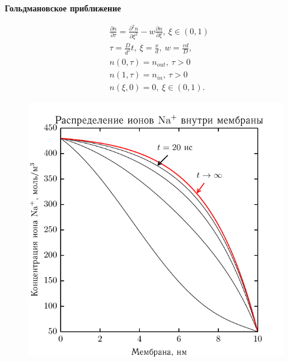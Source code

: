 \documentclass[10pt,pdf]{beamer}
\newcommand{\pder}[2] {\frac{\partial #1}{\partial #2}}
\newcommand{\ppder}[2]{\frac{\partial^2 #1}{\partial {#2}^2}}
\begin{document}
\begin{frame}
      \textbf{Гольдмановское приближение}

      \begin{minipage}{.47\textwidth}
\begingroup
\everymath{\scriptstyle}
\scriptsize
        \begin{align*}
            & \pder{n}{\tau} = \ppder{n}{\xi} -
                w\pder{n}{\xi},\ \xi\in(0,1) \\
            & \tau = \frac{D}{d^2}t,\ \xi = \frac{x}{d},\ w = \frac{vd}{D},\\
            & n(0, \tau) = n_{out},\ \tau>0 \\
            & n(1, \tau) = n_{in},\ \tau>0 \\
            & n(\xi, 0) = 0,\ \xi\in(0,1).
        \end{align*}
\endgroup
    \end{minipage}\hfill
      \begin{minipage}{.3\textwidth}
     \begin{figure}[H]
    \begin{center}
        \includegraphics[width=\textwidth]{../plots/linear_field}
    \end{center}
    \end{figure}
\end{minipage}


  \end{frame}
\end{document}
